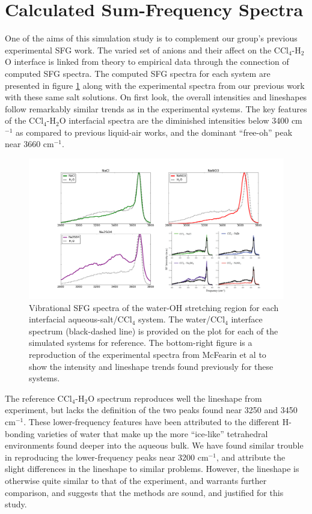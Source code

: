 \section{Calculated Sum-Frequency Spectra}

One of the aims of this simulation study is to complement our group's previous experimental SFG work.\cite{McFearin2009} The varied set of anions and their affect on the CCl$_4$-H$_2$O interface is linked from theory to empirical data through the connection of computed SFG spectra. The computed SFG spectra for each system are presented in figure \ref{fig:sfg-spectra} along with the experimental spectra from our previous work with these same salt solutions.\cite{McFearin2009} On first look, the overall intensities and lineshapes follow remarkably similar trends as in the experimental systems. The key features of the CCl$_4$-H$_2$O interfacial spectra are the diminished intensities below 3400 cm$^{-1}$ as compared to previous liquid-air works, and the dominant ``free-oh'' peak near 3660 cm$^{-1}$.

\begin{figure}[h!]
\begin{center}
	\includegraphics[scale=0.25]{images/sfg-spectra.png}
	\caption{Vibrational SFG spectra of the water-OH stretching region for each interfacial aqueous-salt/CCl$_4$ system. The water/CCl$_4$ interface spectrum (black-dashed line) is provided on the plot for each of the simulated systems for reference. The bottom-right figure is a reproduction of the experimental spectra from McFearin et al to show the intensity and lineshape trends found previously for these systems.\cite{McFearin2009}}
	\label{fig:sfg-spectra}
\end{center}
\end{figure}

The reference CCl$_4$-H$_2$O spectrum reproduces well the lineshape from experiment, but lacks the definition of the two peaks found near 3250 and 3450 cm$^{-1}$. These lower-frequency features have been attributed to the different H-bonding varieties of water that make up the more ``ice-like'' tetrahedral environments found deeper into the aqueous bulk. We have found similar trouble in reproducing the lower-frequency peaks near 3200 cm$^{-1}$, and attribute the slight differences in the lineshape to similar problems.\cite{Walker2006b} However, the lineshape is otherwise quite similar to that of the experiment, and warrants further comparison, and suggests that the methods are sound, and justified for this study.

